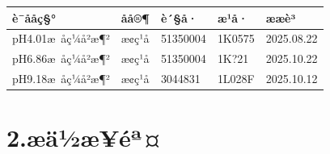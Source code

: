 \documentclass[UTF8,10pt,a4paper,fontset=fandol]{ctexart}
\newcommand{\fieldvalue}[1]{#1}
\newcommand{\handwritten}[1]{#1}
\begin{document}
\begin{tabular}{|p{4.2cm}|p{3cm}|p{3cm}|p{3cm}|p{3cm}|}
\hline
è¯ååç§° & åå®¶ & è´§å· & æ¹å· & ææè³
\\ \hline
\fieldvalue{pH4.01æ åç¼å²æ¶²} &
\fieldvalue{æ¢ç¹å} &
\fieldvalue{\handwritten{51350004}} &
\fieldvalue{\handwritten{1K0575}} &
\fieldvalue{\handwritten{2025.08.22}}
\\ \hline
\fieldvalue{pH6.86æ åç¼å²æ¶²} &
\fieldvalue{æ¢ç¹å} &
\fieldvalue{\handwritten{51350004}} &
\fieldvalue{\handwritten{1K?21}} &
\fieldvalue{\handwritten{2025.10.22}}
\\ \hline
\fieldvalue{pH9.18æ åç¼å²æ¶²} &
\fieldvalue{æ¢ç¹å} &
\fieldvalue{\handwritten{3044831}} &
\fieldvalue{\handwritten{1L028F}} &
\fieldvalue{\handwritten{2025.10.12}}
\\ \hline
\end{tabular}

\section*{2.\quad æä½æ­¥éª¤}
\end{document}
